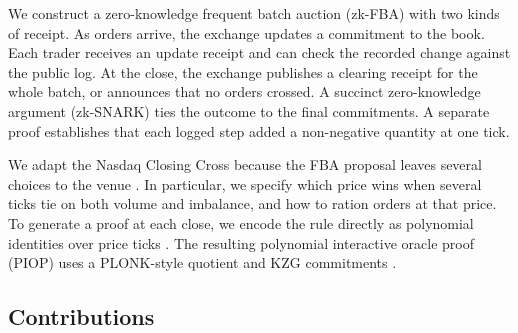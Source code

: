 We construct a zero-knowledge frequent batch auction (zk-FBA) with two kinds
of receipt. As orders arrive, the exchange updates a commitment to the book.
Each trader receives an update receipt and can check the recorded change
against the public log. At the close, the exchange publishes a clearing
receipt for the whole batch, or announces that no orders crossed. A succinct
zero-knowledge argument (zk-SNARK) ties the outcome to the final commitments.
A separate proof establishes that each logged step added a non-negative
quantity at one tick.

We adapt the Nasdaq Closing Cross \cite{nasdaq4754} because the FBA proposal
leaves several choices to the venue \cite{budish2014}. In particular, we
specify which price wins when several ticks tie on both volume and imbalance,
and how to ration orders at that price. To generate a proof at each close, we
encode the rule directly as polynomial identities over price ticks
\cite{plonkbook}. The resulting polynomial interactive oracle proof (PIOP)
\cite{dark2020} uses a PLONK-style quotient \cite{plonk2019} and KZG
commitments \cite{kzg2010}.

\subsection{Contributions}

